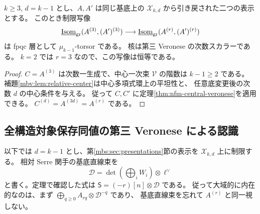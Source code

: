 \begin{theorem}
\label{mbv:thm:third-lift}
$k\geq3$, $d=k-1$ とし、$A,A'$ は同じ基底上の
$\mathcal X_{k,d}$ から引き戻された二つの表示とする。
このとき制限写像
\[
 \underline{\operatorname{Isom}}_{\rm gr}(A^{(3)},(A')^{(3)})
 \longrightarrow
 \underline{\operatorname{Isom}}_{\rm gr}(A^{(r)},(A')^{(r)})
\]
は fpqc 層として $\mu_{k-1}$-torsor である。
核は第三 Veronese の次数スカラーである。
$k=2$ では $r=3$ なので、この写像は恒等である。
\end{theorem}
\begin{proof}
$C=A^{(3)}$ は次数一生成で、中心一次束 $\mathcal V$ の階数は $k-1\geq2$ である。
補題\ref{mbv:lem:relative-center}は中心多項式環上の平坦性と、
任意底変更後の次数 $d$ の中心条件を与える。
従って $C,C'$ に定理\ref{thm:nfm-central-veronese}を適用できる。
$C^{(d)}=A^{(3d)}=A^{(r)}$ である。
\end{proof}

\subsection{全構造対象保存同値の第三 Veronese による認識}

以下では $d=k-1$ とし、第\ref{mbs:sec:presentations}節の表示を
$\mathcal X_{k,d}$ 上に制限する。
相対 Serre 関手の基底直線束を
\[
 \mathcal D=\det\!\left(\bigoplus_iW_i\right)\otimes\ell^\vee
\]
と書く。定理で確認した式は
$\mathsf S=(-r)[n]\otimes\mathcal D$ である。
従って大域的に内在的なのは、まず
$\bigoplus_{q\geq0}A_{rq}\otimes\mathcal D^{-q}$ であり、
基底直線束を忘れて $A^{(r)}$ と同一視しない。

